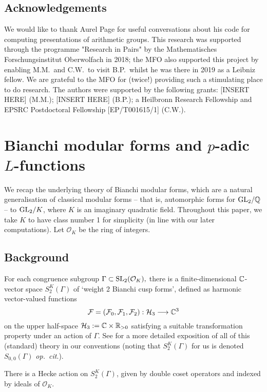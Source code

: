 \documentclass[a4paper,11pt]{article}
\numberwithin{equation}{section}
\begin{document}
\subsection*{Acknowledgements}
We would like to thank Aurel Page for useful conversations about his code for computing presentations of arithmetic groups. This research was supported through the programme "Research in Pairs" by the Mathematisches Forschungsinstitut Oberwolfach in 2018; the MFO also supported this project by enabling M.M.\ and C.W.\ to visit B.P.\ whilst he was there in 2019 as a Leibniz fellow. We are grateful to the MFO for (twice!) providing such a stimulating place to do research. The authors were supported by the following grants: [INSERT HERE] (M.M.); [INSERT HERE] (B.P.); a Heilbronn Research Fellowship and EPSRC Postdoctoral Fellowship [EP/T001615/1] (C.W.).


\section{Bianchi modular forms and \texorpdfstring{$p$}{p}-adic \texorpdfstring{$L$}{L}-functions}
\label{sec:bianchi p-adic l-functions}
We recap the underlying theory of Bianchi modular forms, which are a natural generalisation of classical modular forms -- that is, automorphic forms for $\mathrm{GL}_2/\mathbb{Q}$ -- to $\mathrm{GL}_2/K$, where $K$ is an imaginary quadratic field. Throughout this paper, we take $K$ to have class number 1 for simplicity (in line with our later computations). Let $\mathcal{O}_K$ be the ring of integers. 

\subsection{Background}
For each congruence subgroup $\Gamma \subset \mathrm{SL}_2(\mathcal{O}_K),$ there is a finite-dimensional $\mathbb{C}$-vector space $S_{2}^K(\Gamma)$ of `weight 2 Bianchi cusp forms', defined as harmonic vector-valued functions
\[
    \mathcal{F} = (\mathcal{F}_0,\mathcal{F}_1,\mathcal{F}_2) : \mathcal{H}_3 \longrightarrow \mathbb{C}^3
\]
 on the upper half-space $\mathcal{H}_3 := \mathbb{C}\times\mathbb{R}_{>0}$ satisfying a suitable transformation property under an action of $\Gamma.$ See \cite[\S1]{Wil17} for a more detailed exposition of all of this (standard) theory in our conventions (noting that $S_2^K(\Gamma)$ for us is denoted $S_{0,0}(\Gamma)$ \emph{op.\ cit}.). 
 
 There is a Hecke action on $S_2^K(\Gamma)$, given by double coset operators and indexed by ideals of $\mathcal{O}_K$. 
\end{document}
